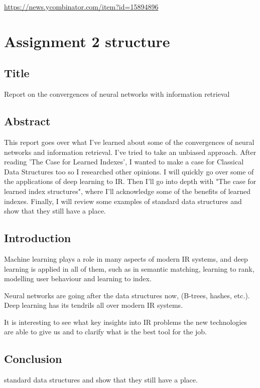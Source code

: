 \documentclass[11pt]{article}
\begin{document}
\url{https://news.ycombinator.com/item?id=15894896}

\section{Assignment 2 structure}
\label{sec:org4e061ec}
\subsection{Title}
\label{sec:org3c50fe3}
Report on the convergences of neural networks with information retrieval

\subsection{Abstract}
\label{sec:org3d15c25}
This report goes over what I've learned about some of the convergences of neural networks and information retrieval.
I've tried to take an unbiased approach. After reading 'The Case for Learned Indexes', I wanted to make a case for Classical Data Structures too so I researched other opinions.
I will quickly go over some of the applications of deep learning to IR.
Then I'll go into depth with "The case for learned index structures", where I'll acknowledge some of the benefits of learned indexes.
Finally, I will review some examples of standard data structures and show that they still have a place.

\subsection{Introduction}
\label{sec:orgebacddc}
Machine learning plays a role in many aspects of modern IR systems, and deep learning is applied in all of them, such as in semantic matching, learning to rank, modelling user behaviour and learning to index.

Neural networks are going after the data structures now, (B-trees, hashes, etc.). Deep learning has its tendrils all over modern IR systems.

It is interesting to see what key insights into IR problems the new technologies are able to give us and to clarify what is the best tool for the job.

\subsection{Conclusion}
\label{sec:org3005e65}
standard data structures and show that they still have a place.
\end{document}
